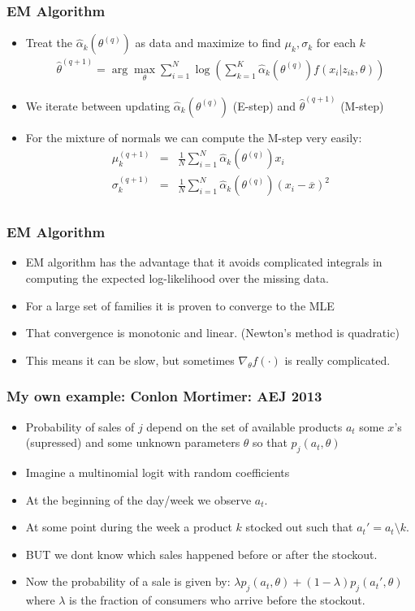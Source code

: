 \documentclass[xcolor=pdftex,dvipsnames,table,mathserif]{beamer}
\begin{document}
\begin{frame}
\frametitle{EM Algorithm}
\begin{itemize}
\item Treat the $\hat{\alpha}_k(\theta^{(q)})$ as data and maximize to find $\mu_k,\sigma_k$ for each $k$
\begin{eqnarray*}
\hat{\theta}^{(q+1)} = \arg \max_{\theta}  \sum_{i=1}^N  \log \left( \sum_{k=1}^K \hat{\alpha}_k(\theta^{(q)}) f(x_i | z_{ik}, \theta ) \right)
\end{eqnarray*}
\item We iterate between updating $\hat{\alpha}_k(\theta^{(q)})$ (E-step) and $\hat{\theta}^{(q+1)}$ (M-step)
\item For the mixture of normals we can compute the M-step very easily:
\begin{eqnarray*}
\mu_k^{(q+1)} &=& \frac{1}{N} \sum_{i=1}^N \hat{\alpha}_k(\theta^{(q)}) x_{i}\\
\sigma_k^{(q+1)} &=& \frac{1}{N} \sum_{i=1}^N \hat{\alpha}_k(\theta^{(q)}) (x_{i} - \overline{x})^2 \\
\end{eqnarray*}
\end{itemize}
\end{frame}

\begin{frame}
\frametitle{EM Algorithm}
\begin{itemize}
\item EM algorithm has the advantage that it avoids complicated integrals in computing the expected log-likelihood over the missing data.
\item For a large set of families it is proven to converge to the MLE
\item That convergence is \alert{monotonic} and \alert{linear}. (Newton's method is quadratic)
\item This means it can be slow, but sometimes $\nabla_{\theta} f (\cdot)$ is really complicated.
\end{itemize}
\end{frame}

\begin{frame}
\frametitle{My own example: Conlon Mortimer: AEJ 2013}
\begin{itemize}
\item Probability of sales of $j$ depend on the set of available products $a_t$ some $x$'s (supressed) and some unknown parameters $\theta$ so that $p_j(a_t,\theta)$
\item Imagine a multinomial logit with random coefficients
\item At the beginning of the day/week we observe $a_t$. 
\item At some point during the week a product $k$ stocked out such that $a_t' = a_t \setminus k$.
\item BUT we dont know which sales happened before or after the stockout.
\item Now the probability of a sale is given by: $\lambda p_j(a_t,\theta) + (1-\lambda) p_j(a_t',\theta)$ where $\lambda$ is the fraction of consumers who arrive before the stockout.
\end{itemize}
\end{frame}
\end{document}
